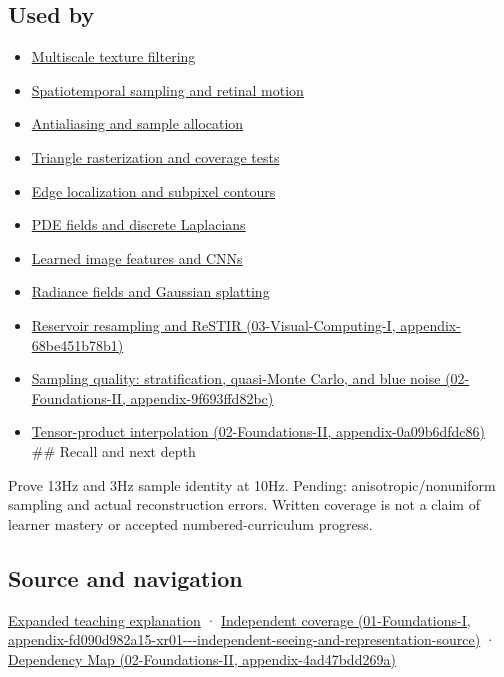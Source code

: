 \subsection{Used by}\label{appendix-6a7869dd79a6-used-by}

\begin{itemize}
\item
  \hyperref[appendix-b677a85ba76f]{Multiscale texture filtering}
\item
  \hyperref[appendix-70895739febb]{Spatiotemporal sampling and retinal motion}
\item
  \hyperref[appendix-4192b2bdd21e]{Antialiasing and sample allocation}
\item
  \hyperref[appendix-ed3f9bc298fe]{Triangle rasterization and coverage tests}
\item
  \hyperref[appendix-36022286b03e]{Edge localization and subpixel contours}
\item
  \hyperref[appendix-1988d465c119]{PDE fields and discrete Laplacians}
\item
  \hyperref[appendix-47c51ea026fb]{Learned image features and CNNs}
\item
  \hyperref[appendix-c5b332e400e7]{Radiance fields and Gaussian splatting}
\item
  \href{../03-Visual-Computing-I/main.pdf\#nameddest=appendix-68be451b78b1}{Reservoir resampling and ReSTIR (03-Visual-Computing-I, appendix-68be451b78b1)}
\item
  \href{../02-Foundations-II/main.pdf\#nameddest=appendix-9f693ffd82bc}{Sampling quality: stratification, quasi-Monte Carlo, and blue noise (02-Foundations-II, appendix-9f693ffd82bc)}
\item
  \href{../02-Foundations-II/main.pdf\#nameddest=appendix-0a09b6dfdc86}{Tensor-product interpolation (02-Foundations-II, appendix-0a09b6dfdc86)} \#\# Recall and next depth
\end{itemize}

Prove 13Hz and 3Hz sample identity at 10Hz. Pending: anisotropic/nonuniform sampling and actual reconstruction errors. Written coverage is not a claim of learner mastery or accepted numbered-curriculum progress.

\subsection{Source and navigation}\label{appendix-6a7869dd79a6-source-and-navigation}

\hyperref[04-visual-computing-ii-ch042-sampling-is-a-question-of-what-remains-distinguishable]{Expanded teaching explanation} · \href{../01-Foundations-I/main.pdf\#nameddest=appendix-fd090d982a15-xr01---independent-seeing-and-representation-source}{Independent coverage (01-Foundations-I, appendix-fd090d982a15-xr01-\/-\/-independent-seeing-and-representation-source)} · \href{../02-Foundations-II/main.pdf\#nameddest=appendix-4ad47bdd269a}{Dependency Map (02-Foundations-II, appendix-4ad47bdd269a)}

